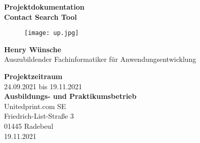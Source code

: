 \begin{titlepage}
    \begin{center}
        {\LARGE\textbf{Projektdokumentation\\}}
        \vspace*{0.5cm}
        {\Huge\textbf{Contact Search Tool}}
        \vspace*{2cm}
        \begin{figure}[hbp]
            \begin{center}
                \texttt{[image: up.jpg]}
            \end{center}
        \end{figure}

        \vfill

        {\textbf{Henry Wünsche}} \\
        Auszubildender Fachinformatiker für Anwendungsentwicklung

        \vspace{0.8cm}
        {\textbf{Projektzeitraum}}\\
        24.09.2021 bis 19.11.2021\\
        \vspace{0.8cm}
        \textbf{Ausbildungs- und Praktikumsbetrieb}\\
        Unitedprint.com SE\\
        Friedrich-List-Straße 3\\
        01445 Radebeul\\
        \vspace*{0.8cm}
        19.11.2021
    \end{center}
\end{titlepage}
\pagebreak
